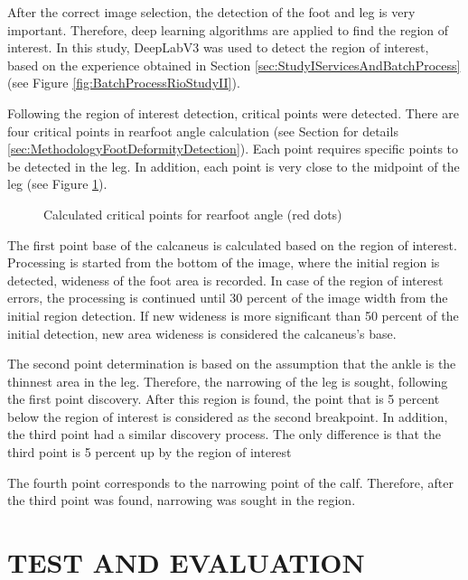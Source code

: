 After the correct image selection, the detection of the foot and leg is very important. Therefore, deep learning algorithms are applied to find the region of interest. In this study, DeepLabV3 was used to detect the region of interest, based on the experience obtained in Section \ref{sec:StudyIServicesAndBatchProcess} (see Figure \ref{fig:BatchProcessRioStudyII}).

Following the region of interest detection, critical points were detected. There are four critical points in rearfoot angle calculation (see Section for details \ref{sec:MethodologyFootDeformityDetection}). Each point requires specific points to be detected in the leg. In addition, each point is very close to the midpoint of the leg (see Figure \ref{fig:BatchProcessDotsStudyII}).

\begin{figure}[htbp]
\centering
{}
\caption{Calculated critical points for rearfoot angle (red dots)}
\label{fig:BatchProcessDotsStudyII}
\end{figure}

The first point base of the calcaneus is calculated based on the region of interest. Processing is started from the bottom of the image, where the initial region is detected, wideness of the foot area is recorded. In case of the region of interest errors, the processing is continued until 30 percent of the image width from the initial region detection. If new wideness is more significant than 50 percent of the initial detection, new area wideness is considered the calcaneus's base.

The second point determination is based on the assumption that the ankle is the thinnest area in the leg. Therefore, the narrowing of the leg is sought, following the first point discovery. After this region is found, the point that is 5 percent below the region of interest is considered as the second breakpoint. In addition, the third point had a similar discovery process. The only difference is that the third point is 5 percent up by the region of interest

The fourth point corresponds to the narrowing point of the calf. Therefore, after the third point was found, narrowing was sought in the region.

\section{TEST AND EVALUATION}\label{sec:StudyIITestAndEvaluation}

